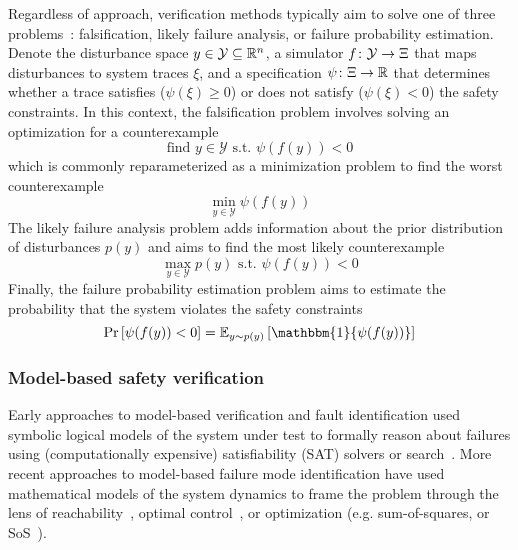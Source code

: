 Regardless of approach, verification methods typically aim to solve one of three problems~\cite{corsoSurveyAlgorithmsBlackBox2021a}: falsification, likely failure analysis, or failure probability estimation. Denote the disturbance space $y \in \mathcal{Y} \subseteq \mathbb{R}^n$, a simulator $f \colon \mathcal{Y} \to \Xi$ that maps disturbances to system traces $\xi$, and a specification $\psi \colon \Xi \to \mathbb{R}$ that determines whether a trace satisfies ($\psi(\xi) \geq 0$) or does not satisfy ($\psi(\xi) < 0$) the safety constraints. In this context, the falsification problem involves solving an optimization for a counterexample
%
\begin{equation}
    \text{find } {y \in \mathcal{Y}} \text{ s.t. } \psi(f(y)) < 0
\end{equation}
%
which is commonly reparameterized as a minimization problem to find the worst counterexample
%
\begin{equation}
    \min_{y \in \mathcal{Y}} \psi(f(y))\label{ch4:eq:falsification_opt}
\end{equation}
%
The likely failure analysis problem adds information about the prior distribution of disturbances $p(y)$ and aims to find the most likely counterexample
%
\begin{equation}
    \max_{y \in \mathcal{Y}} p(y) \text{ s.t. } \psi(f(y)) < 0 \label{ch4:eq:likely_failure_opt}
\end{equation}
%
Finally, the failure probability estimation problem aims to estimate the probability that the system violates the safety constraints
%
\begin{equation}
    \Pr\left[\psi(f(y)) < 0\right] = \mathbb{E}_{y \sim p(y)}\left[\mathbbm{1}\{\psi(f(y))\} \right] \label{ch4:eq:failure_probability}
\end{equation}

\subsubsection{Model-based safety verification}





Early approaches to model-based verification and fault identification used symbolic logical models of the system under test to formally reason about failures using (computationally expensive) satisfiability (SAT) solvers or search~\cite{dekleerDiagnosingMultipleFaults1987,benardRemoteAgentExperiment2000}. More recent approaches to model-based failure mode identification have used mathematical models of the system dynamics to frame the problem through the lens of reachability~\cite{annpureddySTaLiRoToolTemporal2011a,bansalHamiltonJacobiReachabilityBrief2017}, optimal control~\cite{chouUsingControlSynthesis2018}, or optimization (e.g. sum-of-squares, or SoS~\cite{ahmadiApplicationsPolynomialOptimization2016,majumdarControlVerificationHighdimensional2014}).

